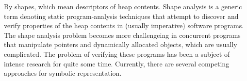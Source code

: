 By shapes, which mean descriptors of heap contents. Shape analysis is a generic term denoting static
program-analysis techniques that attempt to discover and verify properties of the heap contents in (usually imperative) software programs. The shape analysis problem becomes more challengeing in concurrent programs that manipulate pointers and dynamically allocated objects, which are usually complicated. 
 The problem of verifying these programs has been a subject of intense research for quite some time. Currently, there are several competing approaches for symbolic representation. 
